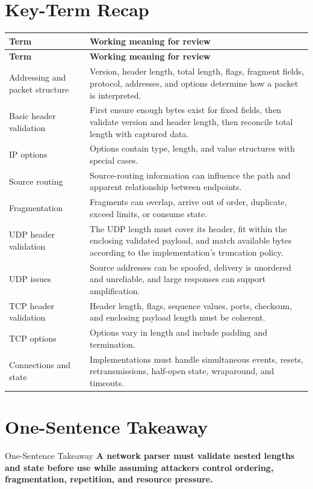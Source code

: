 \documentclass[11pt,letterpaper]{article}
\begin{document}
\section{Key-Term Recap}
\begin{longtable}{>{\raggedright\arraybackslash}p{}p{}}
\toprule
\textbf{Term} & \textbf{Working meaning for review} \\
\midrule
\endfirsthead
\toprule
\textbf{Term} & \textbf{Working meaning for review} \\
\midrule
\endhead
Addressing and packet structure & Version, header length, total length, flags, fragment fields, protocol, addresses, and options determine how a packet is interpreted. \\
Basic header validation & First ensure enough bytes exist for fixed fields, then validate version and header length, then reconcile total length with captured data. \\
IP options & Options contain type, length, and value structures with special cases. \\
Source routing & Source-routing information can influence the path and apparent relationship between endpoints. \\
Fragmentation & Fragments can overlap, arrive out of order, duplicate, exceed limits, or consume state. \\
UDP header validation & The UDP length must cover its header, fit within the enclosing validated payload, and match available bytes according to the implementation's truncation policy. \\
UDP issues & Source addresses can be spoofed, delivery is unordered and unreliable, and large responses can support amplification. \\
TCP header validation & Header length, flags, sequence values, ports, checksum, and enclosing payload length must be coherent. \\
TCP options & Options vary in length and include padding and termination. \\
Connections and state & Implementations must handle simultaneous events, resets, retransmissions, half-open state, wraparound, and timeouts. \\
\bottomrule
\end{longtable}
\section{One-Sentence Takeaway}
\begin{CornellExamBox}{One-Sentence Takeaway}
\textbf{A network parser must validate nested lengths and state before use while assuming attackers control ordering, fragmentation, repetition, and resource pressure.}
\end{CornellExamBox}
\end{document}
